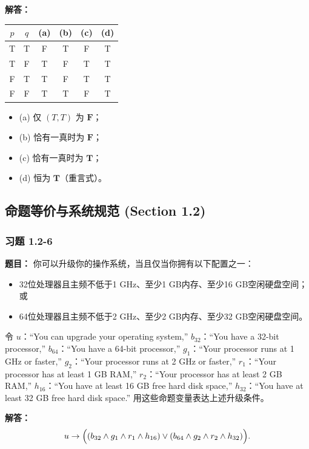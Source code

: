 \documentclass[11pt,UTF8]{article}
\begin{document}
\textbf{解答：}
\begin{center}
\begin{tabular}{cc|cccc}
\hline
$p$ & $q$ & (a) & (b) & (c) & (d) \\
\hline
T & T & F & T & F & T \\
T & F & T & F & T & T \\
F & T & T & F & T & T \\
F & F & T & T & F & T \\
\hline
\end{tabular}
\end{center}
\begin{itemize}
    \item (a) 仅 $(T,T)$ 为 $\mathbf{F}$；
    \item (b) 恰有一真时为 $\mathbf{F}$；
    \item (c) 恰有一真时为 $\mathbf{T}$；
    \item (d) 恒为 $\mathbf{T}$（重言式）。
\end{itemize}



\subsection{命题等价与系统规范 (Section 1.2)}

\subsubsection*{习题 1.2-6}
\textbf{题目：} 你可以升级你的操作系统，当且仅当你拥有以下配置之一：
\begin{itemize}
    \item 32位处理器且主频不低于1 GHz、至少1 GB内存、至少16 GB空闲硬盘空间；或
    \item 64位处理器且主频不低于2 GHz、至少2 GB内存、至少32 GB空闲硬盘空间。
\end{itemize}
令 $u$：``You can upgrade your operating system,'' $b_{32}$：``You have a 32-bit processor,'' $b_{64}$：``You have a 64-bit processor,'' $g_1$：``Your processor runs at 1 GHz or faster,'' $g_2$：``Your processor runs at 2 GHz or faster,'' $r_1$：``Your processor has at least 1 GB RAM,'' $r_2$：``Your processor has at least 2 GB RAM,'' $h_{16}$：``You have at least 16 GB free hard disk space,'' $h_{32}$：``You have at least 32 GB free hard disk space.'' 用这些命题变量表达上述升级条件。

\textbf{解答：}
\[ u \to \Bigl((b_{32} \land g_1 \land r_1 \land h_{16}) \lor (b_{64} \land g_2 \land r_2 \land h_{32})\Bigr). \]
\end{document}
